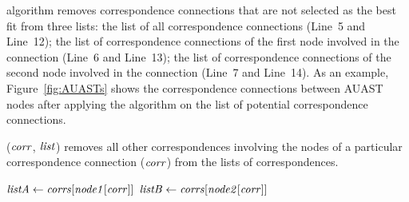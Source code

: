  algorithm removes correspondence connections that are not selected as the best fit from three lists: the list of all correspondence connections (Line~5 and Line~12);
the list of correspondence connections of the first node involved in the connection (Line~6 and Line~13); the list of correspondence connections of the second node involved in the connection (Line~7 and Line~14). As an example, Figure~\ref{fig:AUASTs} shows the correspondence connections between AUAST nodes after applying the  algorithm on the list of potential correspondence connections.


\begin{algorithm}
\caption{($\mathit{corr}$, $\mathit{list}$) removes all other correspondences involving the nodes of a particular correspondence connection ($\mathit{corr}$) from the lists of correspondences.}
\label{removeOtherCEs}
  \begin{algorithmic}[1]
  \RemoveOtherCEs
       \State $\mathit{listA} \gets \mathit{corrs}[\mathit{node1}[\mathit{corr}]]$
	   \State $\mathit{listB} \gets \mathit{corrs}[\mathit{node2}[\mathit{corr}]]$
	   		 \EndIf
	   \EndFor		
	 	 	 		 
	   		 \EndIf
	   \EndFor	  	
  \end{algorithmic}
\end{algorithm}




